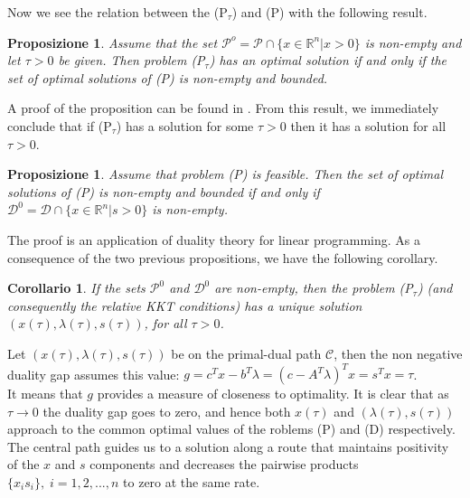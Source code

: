 \documentclass[a4paper,10 pt,titlepage,twoside]{book}
\theoremstyle{plain}
\newtheorem{cor}[thm]{Corollario}
\newtheorem{prop}[thm]{Proposizione}
\theoremstyle{definition}
\theoremstyle{remark}
\begin{document}
Now we see the relation between the (P$_{\tau}$) and (P) with the following result.
\begin{prop}
	Assume that the set $\mathcal{P}^{o} = \mathcal{P}\cap\{x\in\mathbb{R}^{n}| x> 0\}$ is non-empty and let $\tau>0$ be given. Then problem (P$_{\tau}$) has an optimal solution if and only if the set of optimal solutions of (P) is non-empty and bounded.
\end{prop}
A proof of the proposition can be found in \cite{meg}. From this result, we immediately conclude that if (P$_{\tau}$) has a solution for some $\tau>0$ then it has a solution for all $\tau>0$.
\begin{prop}
	Assume that problem (P) is feasible. Then the set of optimal solutions of (P) is non-empty and bounded if and only if $\mathcal{D}^{0} = \mathcal{D}\cap\{x\in\mathbb{R}^{n}| s> 0\}$  is non-empty.
\end{prop}
The proof is an application of duality theory for linear programming. As a consequence of the two previous propositions, we have the following corollary.
\begin{cor}
If the sets $\mathcal{P}^{0}$ and $\mathcal{D}^{0}$ are non-empty, then the problem (P$_{\tau}$) (and consequently the relative KKT conditions) has a unique solution $(x(\tau),\lambda(\tau),s(\tau))$, for all $\tau>0$. 
\end{cor}
Let $(x(\tau), \lambda(\tau), s(\tau))$ be on the primal-dual path $\mathcal{C}$, then the non negative duality gap assumes this value: $g = c^{T}x-b^{T}\lambda=\left(c-A^{T}\lambda\right)^{T}x=s^{T}x=\tau$.\\
It means that $g$ provides a measure of closeness to optimality. It is clear that as $\tau\to0$ the duality gap goes to zero, and hence both $x(\tau)$ and
 $(\lambda(\tau), s(\tau))$ approach to the common optimal values of the roblems (P) and (D) respectively. The central path guides us to a solution along a route that maintains positivity of the $x$ and $s$ components and decreases the pairwise products $\{x_{i}s_{i}\},\;i = 1,2,...,n$ to zero at the same rate.\\
 
\end{document}
